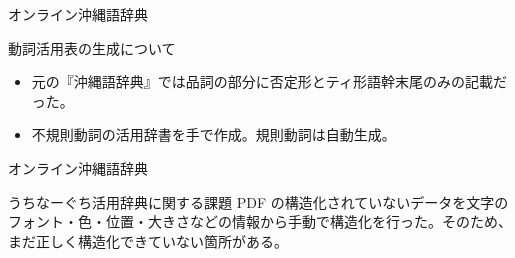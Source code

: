 \documentclass[14pt]{beamer}
\begin{document}
\begin{frame}{オンライン沖縄語辞典}
  \begin{block}{動詞活用表の生成について}
    \begin{itemize}
    \item 元の『沖縄語辞典』では品詞の部分に否定形とティ形語幹末尾のみの記載だった。
    \item 不規則動詞の活用辞書を手で作成。規則動詞は自動生成。
    \end{itemize}
  \end{block}
\end{frame}


\begin{frame}{オンライン沖縄語辞典}
  \begin{block}{うちなーぐち活用辞典に関する課題}
    \vspace{0pt}    
    PDF の構造化されていないデータを文字のフォント・色・位置・大きさなどの情報から手動で構造化を行った。そのため、まだ正しく構造化できていない箇所がある。
  \end{block}
\end{frame}
\end{document}
